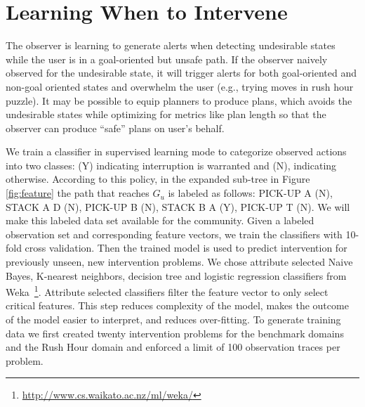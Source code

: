 \section{Learning When to Intervene}
The observer is learning to generate alerts when detecting undesirable states while the user is in a goal-oriented but unsafe path. If the observer naively observed for the undesirable state, it will trigger alerts for both goal-oriented and non-goal oriented states and overwhelm the user (e.g., trying moves in rush hour puzzle). It may be possible to equip planners to produce plans, which avoids the undesirable states while optimizing for metrics like plan length so that the observer can produce ``safe'' plans on user's behalf.

We train a classifier in supervised learning mode to categorize observed actions into two classes: (Y) indicating interruption is warranted and (N), indicating otherwise. According to this policy, in the expanded sub-tree in Figure \ref{fig:feature} the path that reaches $G_u$ is labeled as follows: PICK-UP A (N), STACK A D (N), PICK-UP B (N), STACK B A (Y), PICK-UP T (N). We will make this labeled data set available for the community. Given a labeled observation set and corresponding feature vectors, we train the classifiers with 10-fold cross validation. Then the trained model is used to predict intervention for previously unseen, new intervention problems. We chose attribute selected Naive Bayes, K-nearest neighbors, decision tree and logistic regression classifiers from Weka~\footnote{\url{http://www.cs.waikato.ac.nz/ml/weka/}}. Attribute selected classifiers filter the feature vector to only select critical features. This step reduces complexity of the model, makes the outcome of the model easier to interpret, and reduces over-fitting. To generate training data we first created twenty intervention problems for the benchmark domains and the Rush Hour domain and enforced a limit of 100 observation traces per problem.  




